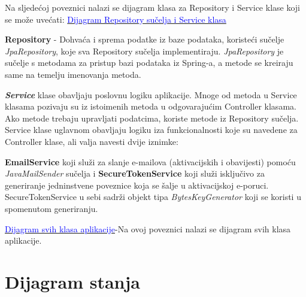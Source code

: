     Na sljedećoj poveznici nalazi se dijagram klasa za Repository i Service klase koji se može uvećati: \href{https://drive.google.com/file/d/1SzOhj1Bq-YyAUKqIZqTj0oUILVQYDE_b/view?usp=sharing}{\textcolor{blue}{Dijagram Repository sučelja i Service klasa}}
    
    
    \textbf{Repository} - Dohvaća i sprema podatke iz baze podataka, koristeći  sučelje \textit{JpaRepository}, koje sva Repository sučelja implementiraju. \textit{JpaRepository} je sučelje s metodama za pristup bazi podataka iz Spring-a, a metode se kreiraju same na temelju imenovanja metoda.
    
    \textbf{\textit{Service}} klase obavljaju poslovnu logiku aplikacije. Mnoge od metoda u Service klasama pozivaju su iz istoimenih metoda u odgovarajućim Controller klasama. Ako metode trebaju upravljati podatcima, koriste metode iz Repository sučelja.  Service klase uglavnom obavljaju logiku iza funkcionalnosti koje su navedene za Controller klase, ali valja navesti dvije iznimke:
    
    \textbf{EmailService} koji služi za slanje e-mailova (aktivacijskih i obavijesti) pomoću \textit{JavaMailSender} sučelja i
    \textbf{SecureTokenService} koji služi isključivo za generiranje jedninstvene poveznice koja se šalje u aktivacijskoj e-poruci. SecureTokenService u sebi sadrži objekt tipa \textit{BytesKeyGenerator} koji se koristi u spomenutom generiranju.
    
    \href{https://drive.google.com/file/d/1oA-XBPEW6Ks2GIoX5Iqn9XRFGumoSmCd/view?usp=sharing}{\textcolor{blue}{Dijagram svih klasa aplikacije}}-Na ovoj poveznici nalazi se dijagram svih klasa aplikacije.


			
			
			
			
			
		    
		
		
\section{Dijagram stanja}
			
